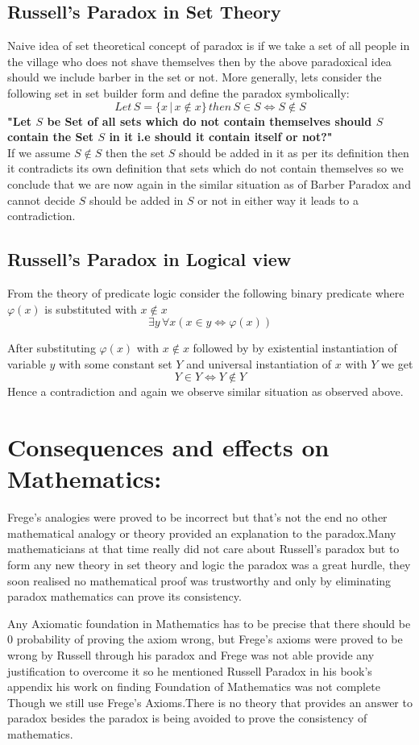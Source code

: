 \documentclass[a4paper]{article}
\begin{document}
\subsection{Russell's Paradox in Set Theory}
Naive idea of set theoretical concept of paradox is if we take a set
of all people in the village who does not shave themselves then by 
the above paradoxical idea should we include barber in the set or not.
More generally, lets consider the following set in set builder form
and define the paradox symbolically:
$$ Let \, S=\{x \,|\, x \notin x\}\,then\,S \in S \iff S\notin S $$ 
\newpage
\noindent \textbf{"Let $S$ be Set of all sets which do not contain
themselves should $S$ contain the Set $S$ in it i.e should it contain 
itself or not?"}
\\
If we assume $S \notin S$ then the set $S$ should be added in it as 
per its definition then it contradicts its own definition that sets
which do not contain themselves so we conclude that we are now again
in the similar situation as of Barber Paradox and cannot decide  $S$
should be added in $S$ or not in either way it leads to a contradiction.

\subsection{Russell's Paradox in Logical view}
From the theory of predicate logic consider the following binary
predicate where $\varphi(x)$ is substituted with $x\notin x$
 $$\exists y \,\forall x(x \in y \iff \varphi(x)) $$
 
\noindent After substituting $\varphi(x)$ with $x\notin x$ followed by
by existential instantiation of variable $y$ with some constant set $Y$
and universal instantiation of $x$ with $Y$ we get
                 $$Y\in Y  \iff Y \notin Y$$
Hence a contradiction and again we observe similar situation as 
observed above.

\section{Consequences and effects on Mathematics:}
Frege's analogies were proved to be incorrect but that's not the end
no other mathematical analogy or theory provided an explanation to the
paradox.Many mathematicians at that time really did not care about 
Russell's paradox but to form any new theory in set theory and logic
the paradox was a great hurdle, they soon realised no mathematical 
proof was trustworthy and only by eliminating paradox mathematics can
prove its consistency.
\par \null \par
\noindent Any Axiomatic foundation in Mathematics has to be precise 
that there should be $0$ probability of proving the axiom wrong,
but Frege's axioms were proved to be wrong by Russell through his
paradox and Frege was not able provide any justification to overcome
it so he mentioned Russell Paradox in his book's appendix his work
on finding Foundation of Mathematics was not complete Though we
still use Frege's Axioms.There is no theory that provides an answer
to paradox besides the paradox is being avoided to prove the 
consistency of mathematics.
\end{document}
